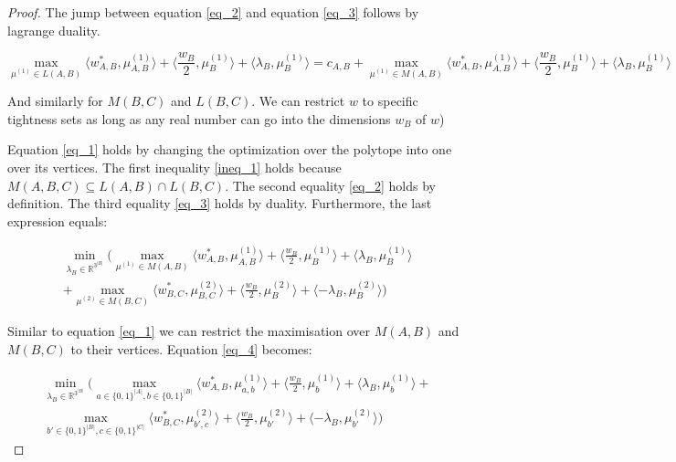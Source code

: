 \begin{proof}
The jump between equation \ref{eq_2} and equation \ref{eq_3} follows by lagrange duality.


\begin{equation}
\max_{  \mu^{(1)} \in L(A,B) }   
                      \langle w_{A,B}^*, \mu^{(1)}_{A,B} \rangle +  \langle \frac{w_B}{2}, \mu_B^{(1)}\rangle +  \langle \lambda_B, \mu_B^{(1)} \rangle = c_{A,B} + \max_{  \mu^{(1)} \in M(A,B) }   
                      \langle w_{A,B}^*, \mu^{(1)}_{A,B} \rangle +  \langle \frac{w_B}{2}, \mu_B^{(1)}\rangle +  \langle \lambda_B, \mu_B^{(1)} \rangle
\end{equation}

And similarly for $M(B,C)$ and $L(B,C)$. We can restrict $w$ to specific tightness sets as long as any real number can go into the dimensions $w_B$ of $w$)


Equation \ref{eq_1} holds by changing the optimization over the polytope into one over its vertices. The first inequality \ref{ineq_1} holds because $M(A,B,C) \subseteq L(A,B) \cap L(B,C)$. The second equality \ref{eq_2} holds by definition. The third equality \ref{eq_3} holds by duality. Furthermore, the last expression equals:

\begin{align}\label{eq_4}
\min_{\lambda_B \in \mathbb{R}^{3^{|B|}}} \Big(    \max_{  \mu^{(1)} \in M(A,B) }   
                      \langle w_{A,B}^*, \mu^{(1)}_{A,B} \rangle +  \langle \frac{w_B}{2}, \mu_B^{(1)}\rangle +  \langle \lambda_B, \mu_B^{(1)} \rangle \\
                      + 
                      \max_{ \mu^{(2)} \in M(B,C) } 
                      \langle w_{B,C}^*, \mu^{(2)}_{B,C} \rangle + \langle \frac{w_B}{2}, \mu_B^{(2)}\rangle + \langle - \lambda_B,  \mu_B^{(2)} \rangle
                      \Big) 
\end{align} 


Similar to equation \ref{eq_1} we can restrict the maximisation over $M(A,B)$ and $M(B,C)$ to their vertices. Equation \ref{eq_4} becomes:

\begin{align}\label{eq_5}
\min_{\lambda_B \in \mathbb{R}^{3^{|B|}}} \Big(    \max_{ a \in \{0,1\}^{|A|}, b \in \{0,1\}^{|B|} }   
                      \langle w_{A,B}^*, \mu^{(1)}_{a,b} \rangle +  \langle \frac{w_B}{2}, \mu_b^{(1)}\rangle +  \langle \lambda_B, \mu_b^{(1)} \rangle + \\
                      \max_{ b' \in \{0,1\}^{|B|}, c \in \{0,1\}^{|C|} } 
                      \langle w_{B,C}^*, \mu^{(2)}_{b',c} \rangle + \langle \frac{w_B}{2}, \mu_{b'}^{(2)}\rangle + \langle - \lambda_B,  \mu_{b'}^{(2)} \rangle
                      \Big) 
\end{align} 


\end{proof}
